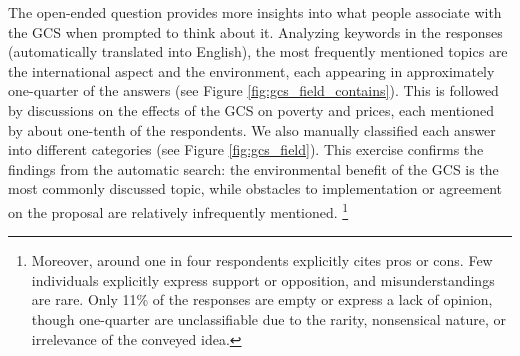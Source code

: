 The open-ended question provides more insights into what people associate with the GCS when prompted to think about it. %
Analyzing keywords in the responses (automatically translated into English), the most frequently mentioned topics are the international aspect and the environment, each appearing in approximately one-quarter of the answers (see Figure \ref{fig:gcs_field_contains}). This is followed by discussions on the effects of the GCS on poverty and prices, each mentioned by about one-tenth of the respondents. We also manually classified each answer into different categories (see Figure \ref{fig:gcs_field}). This exercise confirms the findings from the automatic search: the environmental benefit of the GCS is the most commonly discussed topic, while obstacles to implementation or agreement on the proposal are relatively infrequently mentioned.%
\footnote{Moreover, around one in four respondents explicitly cites pros or cons. Few individuals explicitly express support or opposition, and misunderstandings are rare. Only 11\% of the responses are empty or express a lack of opinion, though one-quarter are unclassifiable due to the rarity, nonsensical nature, or irrelevance of the conveyed idea.}%

